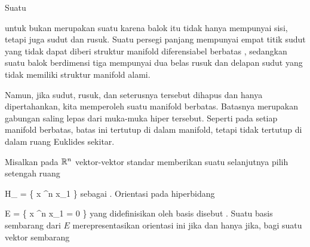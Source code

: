 {

Suatu
 

 {  }

untuk
 bukan merupakan suatu
karena balok itu tidak hanya mempunyai sisi, tetapi juga
 {} {}
sudut dan rusuk. Suatu persegi panjang mempunyai empat titik sudut yang tidak dapat diberi struktur manifold diferensiabel berbatas
 {} {}
 {} {,}
sedangkan suatu balok berdimensi tiga mempunyai dua belas rusuk dan delapan sudut yang tidak memiliki struktur manifold alami.

Namun, jika sudut, rusuk, dan seterusnya tersebut dihapus dan hanya  dipertahankan, kita memperoleh suatu
 {} {}
manifold berbatas. Batasnya merupakan gabungan saling lepas dari muka-muka hiper tersebut. Seperti pada setiap manifold berbatas, batas ini tertutup di dalam manifold, tetapi tidak tertutup di dalam ruang Euklides sekitar.

}


Misalkan pada ${\mathbb R}^n$ vektor-vektor standar
 memberikan suatu
selanjutnya pilih setengah ruang

\mavergleichskettedisp
{\vergleichskette
{ H_{}
}
{ =} { \left\{  x \in \R^n   \mid   x_1          \right\}
}
{ } {
}
{ } {
}
{ } {
}
}
{}{}{}
sebagai . Orientasi pada hiperbidang
 {} {}

\mavergleichskettedisp
{\vergleichskette
{ E
}
{ =} { \left\{  x \in \R^n   \mid   x_1 = 0         \right\}
}
{ } {
}
{ } {
}
{ } {
}
}
{}{}{}
yang didefinisikan oleh basis
 disebut  {.} Suatu basis sembarang
 dari $E$ merepresentasikan orientasi ini jika dan hanya jika, bagi suatu vektor sembarang

